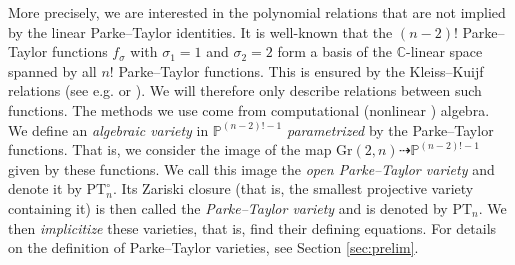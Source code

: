 \documentclass[12pt, reqno]{amsart}
\numberwithin{equation}{section}
\theoremstyle{plain}
\theoremstyle{definition}
\begin{document}
More precisely, we are interested in the polynomial relations that are not implied by the linear Parke--Taylor identities. It is well-known that the $(n-2)!$ Parke--Taylor functions $f_\sigma$ with $\sigma_1=1$ and $\sigma_2=2$ form a basis of the $\mathbb{C}$-linear space spanned by all $n!$ Parke--Taylor functions. This is ensured by the Kleiss--Kuijf relations (see e.g. \cite[Lemma 2.2]{frost2021lie} or \cite{damgaard2021kleiss}). We will therefore only describe relations between such functions. The methods we use come from computational (nonlinear \cite{michalek2021invitation}) algebra. We define an \emph{algebraic variety} in $\mathbb{P}^{(n-2)!-1}$ \emph{parametrized} by the Parke--Taylor functions. That is, we consider the image of the map $\mathrm{Gr}(2,n)\dashrightarrow \mathbb{P}^{(n-2)!-1}$ given by these functions. We call this image the \emph{open Parke--Taylor variety} and denote it by $\mathrm{PT}^\circ_n$. Its Zariski closure (that is, the smallest projective variety containing it) is then called the \emph{Parke--Taylor variety} and is denoted by  $\mathrm{PT}_n$. We then \emph{implicitize} these varieties, that is, find their defining equations. For details on the definition of Parke--Taylor varieties, see Section \ref{sec:prelim}.
\end{document}
